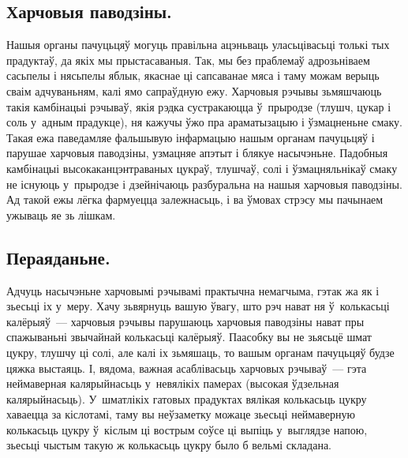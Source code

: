 \subsection{Харчовыя паводзіны.}
Нашыя органы пачуцьцяў могуць правільна ацэньваць уласьцівасьці толькі тых прадуктаў, да якіх мы прыстасаваныя. Так, мы без праблемаў адрозьніваем сасьпелы і нясьпелы яблык, якаснае ці сапсаванае мяса і таму можам верыць сваім адчуваньням, калі ямо сапраўдную ежу. Харчовыя рэчывы зьмяшчаюць такія камбінацыі рэчываў, якія рэдка сустракаюцца ў~прыродзе (тлушч, цукар і соль у~адным прадукце), ня кажучы ўжо пра араматызацыю і ўзмацненьне смаку. Такая ежа паведамляе фальшывую інфармацыю нашым органам пачуцьцяў і парушае харчовыя паводзіны, узмацняе апэтыт і блякуе насычэньне. Падобныя камбінацыі высокаканцэнтраваных цукраў, тлушчаў, солі і ўзмацняльнікаў смаку не існуюць у~прыродзе і дзейнічаюць разбуральна на нашыя харчовыя паводзіны. Ад такой ежы лёгка фармуецца залежнасьць, і ва ўмовах стрэсу мы пачынаем ужываць яе зь лішкам.

\subsection{Пераяданьне.}
Адчуць насычэньне харчовымі рэчывамі практычна немагчыма, гэтак жа як і зьесьці іх у~меру. Хачу зьвярнуць вашую ўвагу, што рэч нават ня ў~колькасьці калёрыяў~--- харчовыя рэчывы парушаюць харчовыя паводзіны нават пры спажываньні звычайнай колькасьці калёрыяў. Паасобку вы не зьясьцё шмат цукру, тлушчу ці солі, але калі іх зьмяшаць, то вашым органам пачуцьцяў будзе цяжка выстаяць. І, вядома, важная асаблівасьць харчовых рэчываў~--- гэта неймаверная калярыйнасьць у~невялікіх памерах (высокая ўдзельная калярыйнасьць). У~шматлікіх гатовых прадуктах вялікая колькасьць цукру хаваецца за кіслотамі, таму вы неўзаметку можаце зьесьці неймаверную колькасьць цукру ў~кіслым ці вострым соўсе ці выпіць у~выглядзе напою, зьесьці чыстым такую ж колькасьць цукру было б вельмі складана.


